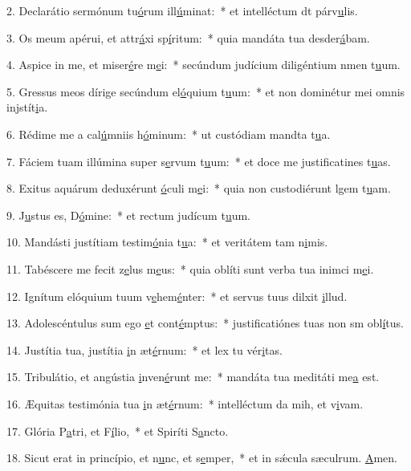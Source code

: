 2. Declarátio sermónum tu\uline{ó}rum ill\uline{ú}minat:~* et intelléctum dt párv\uline{u}lis.\par 
3. Os meum apérui, et attr\uline{á}xi sp\uline{í}ritum:~* quia mandáta tua desder\uline{á}bam.\par 
4. Aspice in me, et miser\uline{é}re m\uline{e}i:~* secúndum judícium diligéntium nmen t\uline{u}um.\par 
5. Gressus meos dírige secúndum el\uline{ó}quium t\uline{u}um:~* et non dominétur mei omnis injstít\uline{i}a.\par 
6. Rédime me a cal\uline{ú}mniis h\uline{ó}minum:~* ut custódiam mandta t\uline{u}a.\par 
7. Fáciem tuam illúmina super s\uline{e}rvum t\uline{u}um:~* et doce me justificatines t\uline{u}as.\par 
8. Exitus aquárum deduxérunt \uline{ó}culi m\uline{e}i:~* quia non custodiérunt lgem t\uline{u}am.\par 
9. J\uline{u}stus es, D\uline{ó}mine:~* et rectum judícum t\uline{u}um.\par 
10. Mandásti justítiam testim\uline{ó}nia t\uline{u}a:~* et veritátem tam n\uline{i}mis.\par 
11. Tabéscere me fecit z\uline{e}lus m\uline{e}us:~* quia oblíti sunt verba tua inimci m\uline{e}i.\par 
12. Ignítum elóquium tuum v\uline{e}hem\uline{é}nter:~* et servus tuus dilxit \uline{i}llud.\par 
13. Adolescéntulus sum ego \uline{e}t cont\uline{é}mptus:~* justificatiónes tuas non sm obl\uline{í}tus.\par 
14. Justítia tua, justítia \uline{i}n æt\uline{é}rnum:~* et lex tu vér\uline{i}tas.\par 
15. Tribulátio, et angústia \uline{i}nven\uline{é}runt me:~* mandáta tua meditáti me\uline{a} est.\par 
16. Æquitas testimónia tua \uline{i}n æt\uline{é}rnum:~* intelléctum da mih, et v\uline{i}vam.\par 
17. Glória P\uline{a}tri, et F\uline{í}lio,~* et Spiríti S\uline{a}ncto.\par 
18. Sicut erat in princípio, et n\uline{u}nc, et s\uline{e}mper,~* et in sǽcula sæculrum. \uline{A}men.\par 
